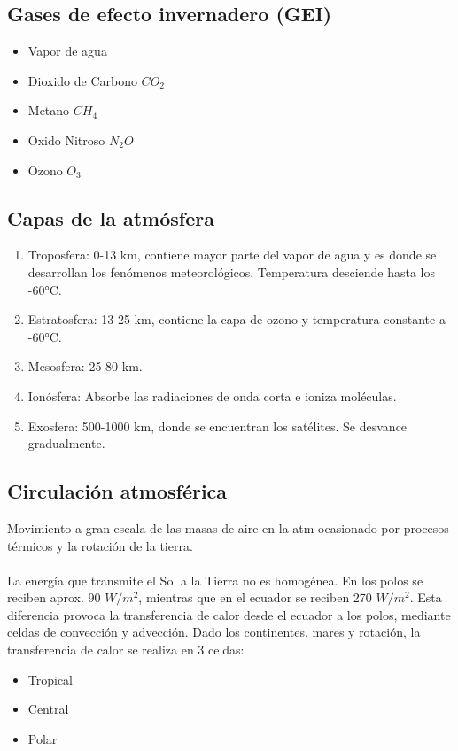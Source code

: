 \subsection{Gases de efecto invernadero (GEI)}

\begin{itemize}
    \item Vapor de agua
    \item Dioxido de Carbono $CO_2$
    \item Metano $CH_4$
    \item Oxido Nitroso $N_2O$
    \item Ozono $O_3$
\end{itemize}

\subsection{Capas de la atmósfera}

\begin{enumerate}
    \item Troposfera: 0-13 km, contiene mayor parte del vapor de agua y es donde se desarrollan los fenómenos meteorológicos. Temperatura desciende hasta los -60°C.
    \item Estratosfera: 13-25 km, contiene la capa de ozono y temperatura constante a -60°C.
    \item Mesosfera: 25-80 km.
    \item Ionósfera: Absorbe las radiaciones de onda corta e ioniza moléculas.
    \item Exosfera: 500-1000 km, donde se encuentran los satélites. Se desvance gradualmente.
\end{enumerate}

\subsection{Circulación atmosférica}

Movimiento a gran escala de las masas de aire en la atm ocasionado por procesos térmicos y la rotación de la tierra.
\\\\
La energía que transmite el Sol a la Tierra no es homogénea. En los polos se reciben aprox. 90 $W/m^2$, mientras que en el ecuador se reciben 270 $W/m^2$. Esta diferencia provoca la transferencia de calor desde el ecuador a los polos, mediante celdas de convección y advección. Dado los continentes, mares y rotación, la transferencia de calor se realiza en 3 celdas:
\begin{itemize}
    \item Tropical
    \item Central
    \item Polar
\end{itemize}

